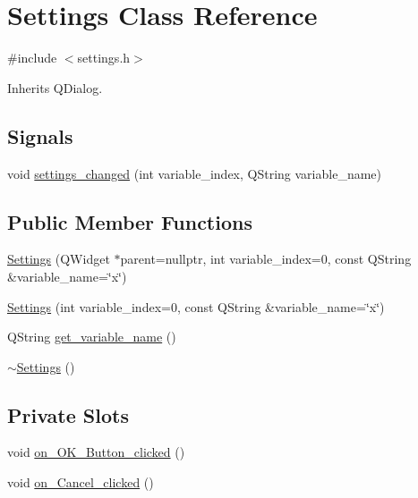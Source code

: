 \hypertarget{classSettings}{}\section{Settings Class Reference}
\label{classSettings}


{\ttfamily \#include $<$settings.\+h$>$}



Inherits Q\+Dialog.

\subsection*{Signals}
\begin{DoxyCompactItemize}
\item 
void \hyperlink{classSettings_addd8f1efb702a387115ec3523e462e13}{settings\+\_\+changed} (int variable\+\_\+index, Q\+String variable\+\_\+name)
\end{DoxyCompactItemize}
\subsection*{Public Member Functions}
\begin{DoxyCompactItemize}
\item 
\hyperlink{classSettings_a80f4b466d49dd6e7b730700ff8eb97e0}{Settings} (Q\+Widget $\ast$parent=nullptr, int variable\+\_\+index=0, const Q\+String \&variable\+\_\+name=\char`\"{}x\char`\"{})
\item 
\hyperlink{classSettings_afbd1735d66d180763e00dc167919e368}{Settings} (int variable\+\_\+index=0, const Q\+String \&variable\+\_\+name=\char`\"{}x\char`\"{})
\item 
Q\+String \hyperlink{classSettings_aaf4aa310f5064682edccc29425d0eb76}{get\+\_\+variable\+\_\+name} ()
\item 
\hyperlink{classSettings_a4a65be5921dfc9fddc476e5320541d89}{$\sim$\+Settings} ()
\end{DoxyCompactItemize}
\subsection*{Private Slots}
\begin{DoxyCompactItemize}
\item 
void \hyperlink{classSettings_af7f46206f9d5bb9bdac97321214e4560}{on\+\_\+\+O\+K\+\_\+\+Button\+\_\+clicked} ()
\item 
void \hyperlink{classSettings_ac80f93735f4f55c8bed92dadb4ed4a65}{on\+\_\+\+Cancel\+\_\+clicked} ()
\end{DoxyCompactItemize}
